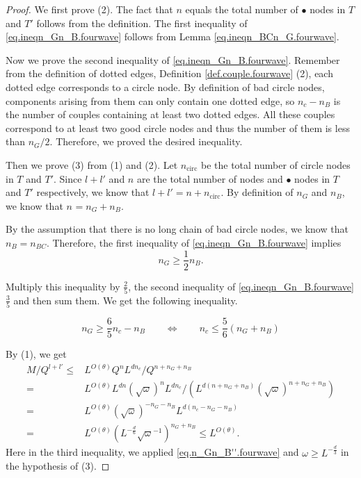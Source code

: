 \begin{proof} We first prove (2). The fact that $n$ equals the total number of $\bullet$ nodes in $T$ and $T'$ follows from the definition. The first inequality of \eqref{eq.ineqn_Gn_B.fourwave} follows from Lemma \ref{eq.ineqn_BCn_G.fourwave}. 
 
    Now we prove the second inequality of \eqref{eq.ineqn_Gn_B.fourwave}. Remember from the definition of dotted edges, Definition \ref{def.couple.fourwave} (2), each dotted edge corresponds to a circle node. By definition of bad circle nodes, components arising from them can only contain one dotted edge, so $n_c - n_B$ is the number of couples containing at least two dotted edges. All these couples correspond to at least two good circle nodes and thus the number of them is less than $n_G/2$. Therefore, we proved the desired inequality.
    
    Then we prove (3) from (1) and (2). Let $n_{\text{circ}}$ be the total number of circle nodes in $T$ and $T'$. Since $l+l'$ and $n$ are the total number of nodes and $\bullet$ nodes in $T$ and $T'$ respectively, we know that $l+l' = n + n_{\text{circ}}$. By definition of $n_G$ and $n_B$, we know that $n_{} = n_{G} + n_{B}$. 
    
    By the assumption that there is no long chain of bad circle nodes, we know that $n_{B} = n_{BC}$. Therefore, the first inequality of \eqref{eq.ineqn_Gn_B.fourwave} implies 
    \begin{equation}\label{eq.n_Gn_B'.fourwave}
     n_{G} \ge \frac{1}{2}n_{B}.
    \end{equation}
    
    Multiply this inequality by $\frac{2}{5}$, the second inequality of \eqref{eq.ineqn_Gn_B.fourwave} $\frac{3}{5}$ and then sum them. We get the following inequality.
    
    \begin{equation}\label{eq.n_Gn_B''.fourwave}
     n_{G} \ge \frac{6}{5}n_c - n_{B}\qquad \Leftrightarrow\qquad n_c \le \frac{5}{6} (n_{G} + n_{B}) 
    \end{equation}
    
    By (1), we get 
    \begin{equation}
     \begin{split}
     M/Q^{l+l'}\leq& L^{O(\theta)} Q^{n} L^{dn_c}/Q^{n+n_G+n_B}
     \\
     =& L^{O(\theta)} L^{dn} (\sqrt{\omega})^{n}L^{dn_c}/(L^{d(n+n_G+n_B)}(\sqrt{\omega})^{n+n_G+n_B})
     \\
     =& L^{O(\theta)} (\sqrt{\omega})^{-n_G-n_B}L^{d(n_c-n_G-n_B)}
     \\
     =& L^{O(\theta)} (L^{-\frac{d}{6}}\sqrt{\omega}^{-1})^{n_G+n_B}\le L^{O(\theta)}.
     \end{split}
    \end{equation}
    Here in the third inequality, we applied \eqref{eq.n_Gn_B''.fourwave} and $\omega \ge L^{-\frac{d}{3}}$ in the hypothesis of (3).
    

\end{proof}
